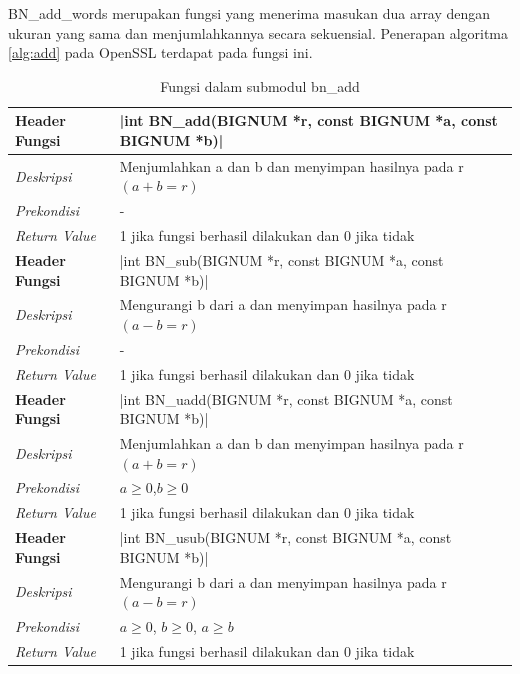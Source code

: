 BN\_add\_words merupakan fungsi yang menerima masukan dua array dengan ukuran yang sama dan menjumlahkannya secara sekuensial. Penerapan algoritma \ref{alg:add} pada OpenSSL terdapat pada fungsi ini.

\begin{table}[!h]
  \caption{Fungsi dalam submodul bn\_add}
  \label{tab:bn_add_func}
  \begin{tabular}{R{2.5cm}L{10.5cm}}
    \toprule
    \textbf{Header Fungsi} & |int BN_add(BIGNUM *r, const BIGNUM *a, const BIGNUM *b)|    \\ \midrule
    \textit{Deskripsi}     & Menjumlahkan a dan b dan menyimpan hasilnya pada r $(a+b=r)$ \\
    \textit{Prekondisi}    & -                                                            \\
    \textit{Return Value}  & 1 jika fungsi berhasil dilakukan dan 0 jika tidak
    \\ \bottomrule
    \textbf{Header Fungsi} & |int BN_sub(BIGNUM *r, const BIGNUM *a, const BIGNUM *b)|    \\ \midrule
    \textit{Deskripsi}     & Mengurangi b dari a dan menyimpan hasilnya pada r $(a-b=r)$  \\
    \textit{Prekondisi}    & -                                                            \\
    \textit{Return Value}  & 1 jika fungsi berhasil dilakukan dan 0 jika tidak
    \\ \bottomrule
    \textbf{Header Fungsi} & |int BN_uadd(BIGNUM *r, const BIGNUM *a, const BIGNUM *b)|   \\ \midrule
    \textit{Deskripsi}     & Menjumlahkan a dan b dan menyimpan hasilnya pada r $(a+b=r)$ \\
    \textit{Prekondisi}    & $a \geq 0$,$ b \geq 0$                                       \\
    \textit{Return Value}  & 1 jika fungsi berhasil dilakukan dan 0 jika tidak
    \\ \bottomrule
    \textbf{Header Fungsi} & |int BN_usub(BIGNUM *r, const BIGNUM *a, const BIGNUM *b)|   \\ \midrule
    \textit{Deskripsi}     & Mengurangi b dari a dan menyimpan hasilnya pada r $(a-b=r)$  \\
    \textit{Prekondisi}    & $a \geq 0$, $b \geq 0$, $a \geq b$                           \\
    \textit{Return Value}  & 1 jika fungsi berhasil dilakukan dan 0 jika tidak
    \\ \bottomrule
  \end{tabular}

\end{table}

